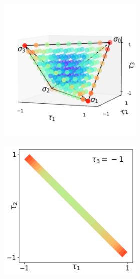 \documentclass[varwidth, border=10pt]{standalone}
\begin{document}
\thispagestyle{empty}

\begin{figure} %
\centering
\begin{subfigure}{0.9\textwidth}
\begin{subfigure}{.666\textwidth}
\centering
\includegraphics[width=.95\columnwidth]{tetra-def.pdf}
\end{subfigure}%
\begin{subfigure}{.333\textwidth}
\includegraphics[width=.95\columnwidth]{corte1-2.pdf} \\

\end{subfigure}
\end{subfigure}
\end{figure}
\end{document}

